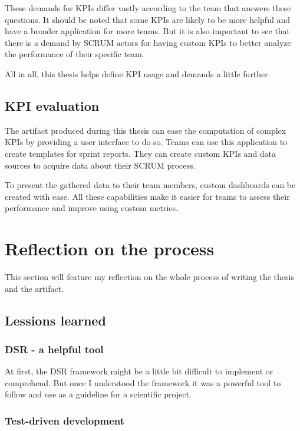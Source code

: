 These demands for KPIs differ vastly according to the team that answers these questions. 
It should be noted that some KPIs are likely to be more helpful and have a broader application for more teams. 
But it is also important to see that there is a demand by SCRUM actors for having custom KPIs to better analyze the performance of their specific team. 

All in all, this thesis helps define KPI usage and demands a little further.

\subsection{KPI evaluation}

The artifact produced during this thesis can ease the computation of complex KPIs by providing a user interface to do so. 
Teams can use this application to create templates for sprint reports. 
They can create custom KPIs and data sources to acquire data about their SCRUM process. 

To present the gathered data to their team members, custom dashboards can be created with ease. 
All these capabilities make it easier for teams to assess their performance and improve using custom metrics.


\section{Reflection on the process}

This section will feature my reflection on the whole process of writing the thesis and the artifact.

\subsection{Lessions learned}

\subsubsection*{DSR - a helpful tool}

At first, the DSR framework might be a little bit difficult to implement or comprehend.
But once I understood the framework it was a powerful tool to follow and use as a guideline for a scientific project. 

\subsubsection*{Test-driven development}

